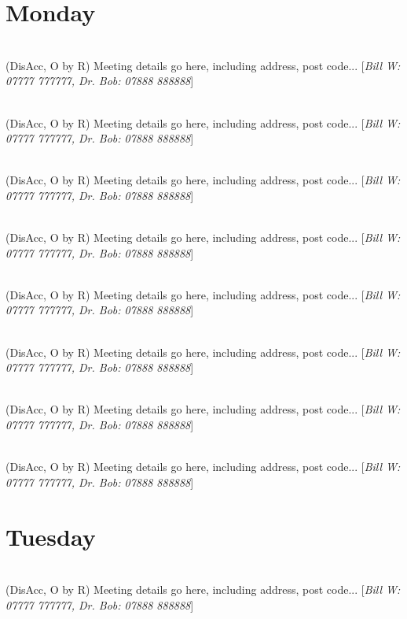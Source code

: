 \documentclass[a4paper]{article}
\newcommand{\mtgname}[1] {\vspace{0.1cm}{\bf #1}\\}   %
\newcommand{\mtgtime}[1] {\hspace{-0.2cm}{\small #1}} %
\newcommand{\mtgdetails}[1] {#1}                      %
\newcommand{\mtgphones}[1] {[\textit{#1}]}            %
\begin{document}

\section*{Monday}

\mtgname{Meeting name goes here}
\mtgtime{12:45--13:45} \mtgdetails{(DisAcc, O by R) Meeting details go here, including address, post code...}
\mtgphones{Bill W: 07777 777777, Dr. Bob: 07888 888888}

\mtgname{Meeting name goes here}
\mtgtime{12:45--13:45} \mtgdetails{(DisAcc, O by R) Meeting details go here, including address, post code...}
\mtgphones{Bill W: 07777 777777, Dr. Bob: 07888 888888}

\mtgname{Meeting name goes here}
\mtgtime{12:45--13:45} \mtgdetails{(DisAcc, O by R) Meeting details go here, including address, post code...}
\mtgphones{Bill W: 07777 777777, Dr. Bob: 07888 888888}

\mtgname{Meeting name goes here}
\mtgtime{12:45--13:45} \mtgdetails{(DisAcc, O by R) Meeting details go here, including address, post code...}
\mtgphones{Bill W: 07777 777777, Dr. Bob: 07888 888888}

\mtgname{Meeting name goes here}
\mtgtime{12:45--13:45} \mtgdetails{(DisAcc, O by R) Meeting details go here, including address, post code...}
\mtgphones{Bill W: 07777 777777, Dr. Bob: 07888 888888}

\mtgname{Meeting name goes here}
\mtgtime{12:45--13:45} \mtgdetails{(DisAcc, O by R) Meeting details go here, including address, post code...}
\mtgphones{Bill W: 07777 777777, Dr. Bob: 07888 888888}

\mtgname{Meeting name goes here}
\mtgtime{12:45--13:45} \mtgdetails{(DisAcc, O by R) Meeting details go here, including address, post code...}
\mtgphones{Bill W: 07777 777777, Dr. Bob: 07888 888888}

\mtgname{Meeting name goes here}
\mtgtime{12:45--13:45} \mtgdetails{(DisAcc, O by R) Meeting details go here, including address, post code...}
\mtgphones{Bill W: 07777 777777, Dr. Bob: 07888 888888}

\newpage{}

\section*{Tuesday}

\mtgname{Meeting name goes here}
\mtgtime{12:45--13:45} \mtgdetails{(DisAcc, O by R) Meeting details go here, including address, post code...}
\mtgphones{Bill W: 07777 777777, Dr. Bob: 07888 888888}
\end{document}
